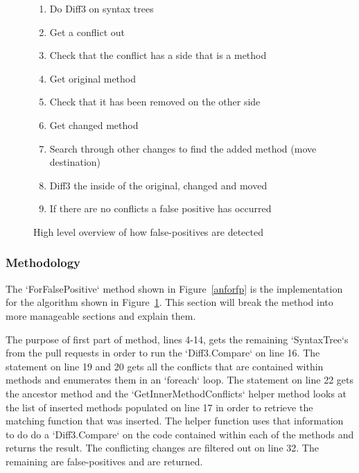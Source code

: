 \documentclass[draftclsnofoot,onecolumn]{IEEEtran}
\begin{document}
\begin{figure}[!htb]
\centering
\begin{enumerate}
    \item Do Diff3 on syntax trees
    \item Get a conflict out
    \item Check that the conflict has a side that is a method
    \item Get original method
    \item Check that it has been removed on the other side
    \item Get changed method
    \item Search through other changes to find the added method (move 
destination)
    \item Diff3 the inside of the original, changed and moved
    \item If there are no conflicts a false positive has occurred
\end{enumerate}
\caption{High level overview of how false-positives are detected}
\label{fpalgore}
\end{figure}

\subsubsection{Methodology}

The `ForFalsePositive` method shown in Figure~\ref{anforfp} is the 
implementation for the algorithm shown in Figure~\ref{fpalgore}. This section 
will break the method into more manageable sections and explain them.

The purpose of first part of method, lines 4-14, gets the remaining 
`SyntaxTree`s from the pull requests in order to run the `Diff3.Compare` on 
line 16. The statement on line 19 and 20 gets all the conflicts that are 
contained within methods and enumerates them in an `foreach` loop. The 
statement on line 22 gets the ancestor method and the `GetInnerMethodConflicts` 
helper method looks at the list of inserted methods populated on line 17 in 
order to retrieve the matching function that was inserted. The helper function 
uses that information to do do a `Diff3.Compare` on the code contained within 
each of the methods and returns the result. The conflicting changes are 
filtered out on line 32. The remaining are false-positives and are returned.
\end{document}
